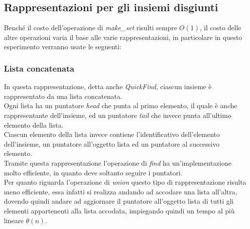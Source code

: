 \documentclass[12pt]{article}
\begin{document}
\subsection{Rappresentazioni per gli insiemi disgiunti}
Benché il costo dell'operazione di \textit{make\_set} risulti sempre $O(1)$, il costo delle altre operazioni varia il base alle varie rappresentazioni, in particolare in questo esperimento verranno usate le seguenti:

    \subsubsection{Lista concatenata} In questa rappresentazione, detta anche \textit{QuickFind}, ciascun insieme è rappresentato da una lista concatenata.\\
    Ogni lista ha un puntatore \textit{head} che punta al primo elemento, il quale è anche rappresentante dell'insieme, ed un puntatore \textit{tail} che invece punta all'ultimo elemento della lista.\\
    Ciascun elemento della lista invece contiene l'identificativo dell'elemento dell'insieme, un puntatore all'oggetto lista ed un puntatore al successivo elemento.\\
    Tramite questa rappresentazione l'operazione di \textit{find} ha un'implementazione molto efficiente, in quanto deve soltanto seguire i puntatori.\\
    Per quanto riguarda l'operazione di \textit{union} questo tipo di rappresentazione risulta meno efficiente, essa infatti si realizza andando ad accodare una lista all'altra, dovendo quindi andare ad aggiornare il puntatore all'oggetto lista di tutti gli elementi appartenenti alla lista accodata, impiegando quindi un tempo al più lineare $\theta(n)$.
\end{document}
